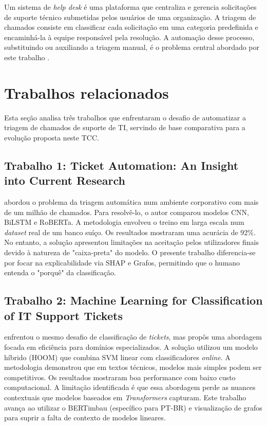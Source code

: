 \documentclass[
    12pt,                %
    openright,           %
    oneside,             %
    a4paper,             %
    english,             %
    brazil               %
]{abntex2}
\begin{document}
Um sistema de \textit{help desk} é uma plataforma que centraliza e gerencia solicitações de suporte técnico submetidas pelos usuários de uma organização. A triagem de chamados consiste em classificar cada solicitação em uma categoria predefinida e encaminhá-la à equipe responsável pela resolução. A automação desse processo, substituindo ou auxiliando a triagem manual, é o problema central abordado por este trabalho \cite{zemp2021}.

\section{Trabalhos relacionados}
\label{sec:trabalhos_relacionados}

Esta seção analisa três trabalhos que enfrentaram o desafio de automatizar a triagem de chamados de suporte de TI, servindo de base comparativa para a evolução proposta neste TCC.

\subsection{Trabalho 1: Ticket Automation: An Insight into Current Research}

 abordou o problema da triagem automática num ambiente corporativo com mais de um milhão de chamados. Para resolvê-lo, o autor comparou modelos CNN, BiLSTM e RoBERTa. A metodologia envolveu o treino em larga escala num \textit{dataset} real de um banco suíço. Os resultados mostraram uma acurácia de 92\%. No entanto, a solução apresentou limitações na aceitação pelos utilizadores finais devido à natureza de "caixa-preta" do modelo. O presente trabalho diferencia-se por focar na explicabilidade via SHAP e Grafos, permitindo que o humano entenda o "porquê" da classificação.

\subsection{Trabalho 2: Machine Learning for Classification of IT Support Tickets}

 enfrentou o mesmo desafio de classificação de \textit{tickets}, mas propôs uma abordagem focada em eficiência para domínios especializados. A solução utilizou um modelo híbrido (HOOM) que combina SVM linear com classificadores \textit{online}. A metodologia demonstrou que em textos técnicos, modelos mais simples podem ser competitivos. Os resultados mostraram boa performance com baixo custo computacional. A limitação identificada é que essa abordagem perde as nuances contextuais que modelos baseados em \textit{Transformers} capturam. Este trabalho avança ao utilizar o BERTimbau (específico para PT-BR) e visualização de grafos para suprir a falta de contexto de modelos lineares.
\end{document}
